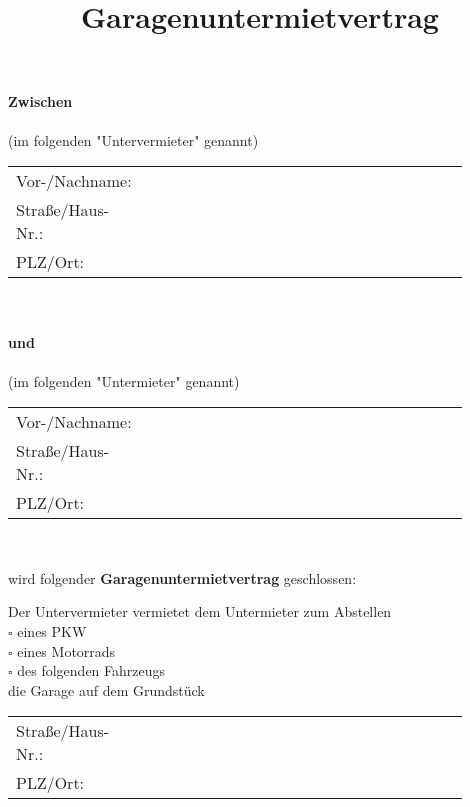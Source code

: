 \documentclass[a4paper]{scrartcl}
\title{Garagenuntermietvertrag}
\date{}
\begin{document}
	
\maketitle

\paragraph{Zwischen} 

(im folgenden "Untervermieter" genannt) \\

\begin{tabular}{p{0.2\linewidth}p{0.7\linewidth}}
	Vor-/Nachname:&\hrulefill
	
	\\
	
	Straße/Haus-Nr.:&\hrulefill
	
	\\
	
	PLZ/Ort:&\hrulefill
\end{tabular}\\

\paragraph{und}

(im folgenden "Untermieter" genannt) \\

\begin{tabular}{p{0.2\linewidth}p{0.7\linewidth}}
	Vor-/Nachname:&\hrulefill
	
	\\
	
	Straße/Haus-Nr.:&\hrulefill
	
	\\
	
	PLZ/Ort:&\hrulefill
\end{tabular}\\

\vspace{5mm}

wird folgender \textbf{Garagenuntermietvertrag} geschlossen:



Der Untervermieter vermietet dem Untermieter zum Abstellen
\vspace{3mm} \\
$\square$ eines PKW \\
$\square$ eines Motorrads \\
$\square$ des folgenden Fahrzeugs \hrulefill 
\vspace{3mm}\\
die Garage auf dem Grundstück
\vspace{3mm} \\
\begin{tabular}{p{0.2\linewidth}p{0.7\linewidth}}
	Straße/Haus-Nr.:&\hrulefill
	
	\\
	
	PLZ/Ort:&\hrulefill
\end{tabular}\\
\end{document}
